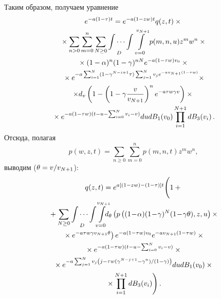 \begin{multicols}{2}
 Таким образом, получаем уравнение
\begin{multline*}
e^{-a(1-\tau)t} = e^{-a(1-zw)t} q(z,t)\times{}\\
{}\times\sum\limits_{n>0} \sum\limits_{m=0}^n 
\sum\limits_{N\geq0} \idotsint\limits_D \int\limits_{v=0}^{v_{N+1}} p(m,n,u)
 z^m w^n\times{}\\
 {}\times (1-\alpha)^n 
(1-\gamma)^{n N} e^{-a(1-\tau w)v_0} \times{}\\
{}\times
e^{-a\sum\nolimits^N_{i=1} (1-\gamma^{N-i+1}\tau)\sum\nolimits^N_{j=1} v_j e^{-
av_{N+1}(1-\tau w)}}\times\\
\times d_v\left( 1-\left( 1-\gamma\displaystyle\frac{\displaystyle v\mathstrut}{\displaystyle v_{N+1}\mathstrut}\right)^n 
e^{-a\tau w\gamma v}\right)\times{}\\
{}\times
e^{-a(1-\tau w)(t-u-\sum\nolimits^N_{i=0} v_i-v)} du 
dB_1(v_0)\prod\limits_{i=1}^{N+1} dB_3(v_i)\,.
\end{multline*}
  Отсюда, полагая 
  $$
  p(w,z,t)= \sum\limits_{n\geq0} \sum\limits^n_{m=0} 
p(m,n,t) z^m w^n,
$$
 выводим ($\theta\hm= v/v_{N+1}$):
  \begin{multline*}
  q(z,t)= e^{a[(1-zw)-(1-\tau)]t}\Bigg( 
  1+ {}\\
    {}+\sum\limits_{N\geq0} \idotsint\limits_D \!\!\int\limits_{v=0}^{v_{N+1}} 
    \hspace*{-2mm}\hspace*{-1.51018pt}
d_\theta\left(p \left( (1\!-\!\alpha)(1\!-\!\gamma)^N (1\!-\!\gamma\theta), z ,
u\right) \times\right.\\
\left.{}\times e^{-a\tau w 
\gamma v_{N+1}\theta}\right) 
  e^{-a(1-\tau w)v_0} e^{-av_{N+1}(1-\tau w)}\times{}\\
  {}\times e^{-a(1-\tau w)(t-u-
\sum\nolimits^N_{i=0} v_i-v)}\times{}\\
{}\times e^{-a\sum\nolimits^N_{j=1} v_j \left(j-\tau w ({\gamma^{N-j+1}-
\gamma^n})/({1-\gamma})\right)} du dB_1(v_0)\times{}\\
{}\times \prod\limits_{i=1}^{N+1} 
dB_3(v_i)\Bigg)\,.
  \end{multline*}
  

\end{multicols}
